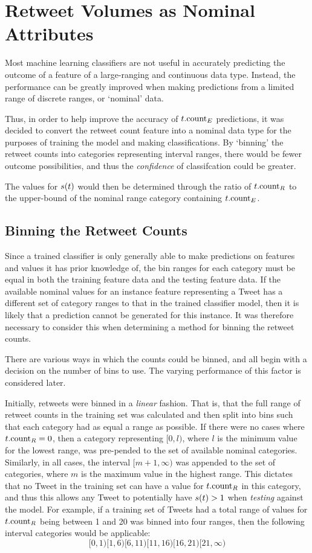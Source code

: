 \section{Retweet Volumes as Nominal Attributes}
Most machine learning classifiers are not useful in accurately predicting the outcome of a feature of a large-ranging and continuous data type. Instead, the performance can be greatly improved when making predictions from a limited range of discrete ranges, or `nominal' data.

Thus, in order to help improve the accuracy of $t.\textrm{count}_E$ predictions, it was decided to convert the retweet count feature into a nominal data type for the purposes of training the model and making classifications. By `binning' the retweet counts into categories representing interval ranges, there would be fewer outcome possibilities, and thus the \textit{confidence} of classifcation could be greater.

The values for $s(t)$ would then be determined through the ratio of $t.\textrm{count}_R$ to the upper-bound of the nominal range category containing $t.\textrm{count}_E$.


\subsection{Binning the Retweet Counts}
Since a trained classifier is only generally able to make predictions on features and values it has prior knowledge of, the bin ranges for each category must be equal in both the training feature data and the testing feature data. If the available nominal values for an instance feature representing a Tweet has a different set of category ranges to that in the trained classifier model, then it is likely that a prediction cannot be generated for this instance. It was therefore necessary to consider this when determining a method for binning the retweet counts.

There are various ways in which the counts could be binned, and all begin with a decision on the number of bins to use. The varying performance of this factor is considered later.

Initially, retweets were binned in a \textit{linear} fashion. That is, that the full range of retweet counts in the training set was calculated and then split into bins such that each category had as equal a range as possible. If there were no cases where $t.\textrm{count}_R = 0$, then a category representing $[0,l)$, where $l$ is the minimum value for the lowest range, was pre-pended to the set of available nominal categories. Similarly, in all cases, the interval $[m+1,\infty)$ was appended to the set of categories, where $m$ is the maximum value in the highest range. This dictates that no Tweet in the training set can have a value for $t.\textrm{count}_R$ in this category, and thus this allows any Tweet to potentially have $s(t) > 1$ when \textit{testing} against the model. For example, if a training set of Tweets had a total range of values for $t.\textrm{count}_R$ being between 1 and 20 was binned into four ranges, then the following interval categories would be applicable:
\[
    [0,1) [1,6) [6,11) [11,16) [16,21) [21,\infty)
\]

